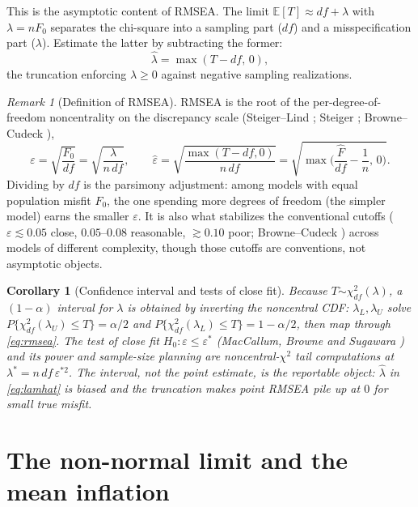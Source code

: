 \documentclass[11pt]{article}
\newcommand{\E}{\mathbb{E}}
\newcommand{\rmsea}{\widehat{\varepsilon}}
\theoremstyle{plain}
\newtheorem{corollary}{Corollary}
\theoremstyle{remark}
\newtheorem*{remark}{Remark}
\begin{document}
This is the asymptotic content of RMSEA. The limit $\E[T]\approx df+\lambda$ with
$\lambda=nF_0$ separates the chi-square into a sampling part ($df$) and a
misspecification part ($\lambda$). Estimate the latter by subtracting the former:
\begin{equation}\label{eq:lamhat}
  \hat\lambda = \max(T-df,\,0),
\end{equation}
the truncation enforcing $\lambda\ge0$ against negative sampling realizations.

\begin{remark}[Definition of RMSEA]
RMSEA is the root of the per-degree-of-freedom noncentrality on the discrepancy
scale (Steiger--Lind \cite{steigerlind1980}; Steiger \cite{steiger1990};
Browne--Cudeck \cite{brownecudeck1992}),
\begin{equation}\label{eq:rmsea}
  \varepsilon = \sqrt{\frac{F_0}{df}} = \sqrt{\frac{\lambda}{n\,df}},
  \qquad
  \rmsea = \sqrt{\frac{\max(T-df,0)}{n\,df}}
         = \sqrt{\max\!\Big(\frac{\hat F}{df}-\frac1n,\,0\Big)} .
\end{equation}
Dividing by $df$ is the parsimony adjustment: among models with equal population
misfit $F_0$, the one spending more degrees of freedom (the simpler model) earns
the smaller $\varepsilon$. It is also what stabilizes the conventional cutoffs
($\varepsilon\lesssim 0.05$ close, $0.05$--$0.08$ reasonable, $\gtrsim0.10$ poor;
Browne--Cudeck \cite{brownecudeck1992}) across models of different complexity,
though those cutoffs are conventions, not asymptotic objects.
\end{remark}

\begin{corollary}[Confidence interval and tests of close fit]\label{cor:ci}
Because $T\dot\sim\chi^2_{df}(\lambda)$, a $(1-\alpha)$ interval for $\lambda$ is
obtained by inverting the noncentral CDF: $\lambda_L,\lambda_U$ solve
$P\{\chi^2_{df}(\lambda_U)\le T\}=\alpha/2$ and
$P\{\chi^2_{df}(\lambda_L)\le T\}=1-\alpha/2$, then map through
\eqref{eq:rmsea}. The test of close fit $H_0:\varepsilon\le\varepsilon^\ast$
(MacCallum, Browne and Sugawara \cite{maccallumbrownesugawara1996}) and its
power and sample-size planning are noncentral-$\chi^2$ tail computations at
$\lambda^\ast=n\,df\,\varepsilon^{\ast2}$. The interval, not the point estimate,
is the reportable object: $\hat\lambda$ in \eqref{eq:lamhat} is biased and the
truncation makes point RMSEA pile up at $0$ for small true misfit.
\end{corollary}

\section{The non-normal limit and the mean inflation}
\end{document}
